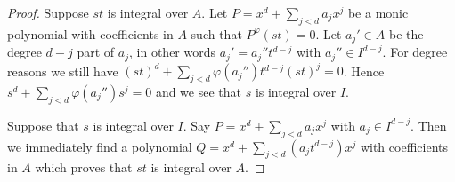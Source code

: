 \documentclass[10pt,a4paper]{amsart}
\theoremstyle{plain}
\theoremstyle{definition}
\theoremstyle{remark}
\numberwithin{equation}{subsection}
\begin{document}
\begin{proof}
Suppose $st$ is integral over $A$.
Let $P = x^d + \sum_{j < d} a_j x^j$
be a monic polynomial with coefficients in $A$
such that $P^\varphi(st) = 0$. Let $a_j' \in A$
be the degree $d-j$ part of $a_j$, in other
words $a_j' = a_j'' t^{d-j}$ with $a_j'' \in I^{d-j}$.
For degree reasons we still have
$(st)^d + \sum_{j < d} \varphi(a_j'') t^{d-j} (st)^j = 0$.
Hence $s^d + \sum_{j < d} \varphi(a_j'') s^j = 0$
and we see that $s$ is integral over $I$.

\medskip\noindent
Suppose that $s$ is integral over $I$.
Say $P = x^d + \sum_{j < d} a_j x^j$
with $a_j \in I^{d-j}$. Then we immediately find a
polynomial $Q = x^d + \sum_{j < d} (a_j t^{d-j}) x^j$
with coefficients in $A$ which proves that
$st$ is integral over $A$.
\end{proof}
\end{document}
